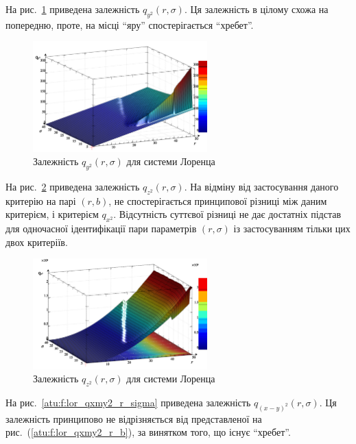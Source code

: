 На рис.~\ref{atu:f:lor_qy2_r_sigma} приведена залежність
$q_{y^2}(r,\sigma)$.
Ця залежність в цілому схожа на попередню, проте, на місці ``яру'' спостерігається ``хребет''.

\begin{figure}[htb!]
  \begin{center}
    \includegraphics[width=0.60\textwidth]{p/cha/lor/q2d/lor_qy2_r_sigma.png}
  \end{center}
  \caption{Залежність $ q_{y^2} (r, \sigma) $ для системи Лоренца}
  \label{atu:f:lor_qy2_r_sigma}
\end{figure}

На рис.~\ref{atu:f:lor_qz2_r_sigma} приведена залежність
$q_{z^2} (r, \sigma) $. На відміну від застосування даного критерію
на парі
$(r, b) $, не спостерігається принципової різниці між даним
критерієм, і критерієм
$q_{x^2} $. Відсутність суттєвої різниці не дає достатніх підстав
для одночасної ідентифікації пари параметрів
$(r, \sigma) $ із застосуванням тільки цих двох критеріїв.

\begin{figure}[htb!]
  \begin{center}
    \includegraphics[width=0.60\textwidth]{p/cha/lor/q2d/lor_qz2_r_sigma.png}
  \end{center}
  \caption{Залежність $q_{z^2}(r,\sigma)$ для системи Лоренца}
  \label{atu:f:lor_qz2_r_sigma}
\end{figure}

На рис.~\ref{atu:f:lor_qxmy2_r_sigma} приведена залежність
$q_{(x-y)^2} (r, \sigma) $. Ця залежність принципово не відрізняється
від представленої на рис.~(\ref{atu:f:lor_qxmy2_r_b}), за винятком того, що
існує ``хребет''.


